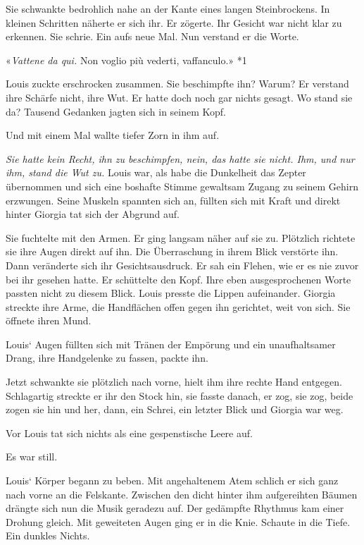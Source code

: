 Sie schwankte bedrohlich nahe an der Kante eines langen Steinbrockens.
In kleinen Schritten näherte er sich ihr. Er zögerte. Ihr Gesicht war
nicht klar zu erkennen. Sie schrie. Ein aufs neue Mal. Nun verstand er
die Worte.

«\emph{Vattene da qui.} Non voglio più vederti, vaffanculo.» *1

Louis zuckte erschrocken zusammen. Sie beschimpfte ihn? Warum? Er
verstand ihre Schärfe nicht, ihre Wut. Er hatte doch noch gar nichts
gesagt. Wo stand sie da? Tausend Gedanken jagten sich in seinem Kopf.

Und mit einem Mal wallte tiefer Zorn in ihm auf.

\emph{Sie hatte kein Recht, ihn zu beschimpfen, nein, das hatte sie
nicht. Ihm, und nur ihm, stand die Wut zu.} Louis war, als habe die
Dunkelheit das Zepter übernommen und sich eine boshafte Stimme gewaltsam
Zugang zu seinem Gehirn erzwungen. Seine Muskeln spannten sich an,
füllten sich mit Kraft und direkt hinter Giorgia tat sich der Abgrund
auf.

Sie fuchtelte mit den Armen. Er ging langsam näher auf sie zu. Plötzlich
richtete sie ihre Augen direkt auf ihn. Die Überraschung in ihrem Blick
verstörte ihn. Dann veränderte sich ihr Gesichtsausdruck. Er sah ein
Flehen, wie er es nie zuvor bei ihr gesehen hatte. Er schüttelte den
Kopf. Ihre eben ausgesprochenen Worte passten nicht zu diesem Blick.
Louis presste die Lippen aufeinander. Giorgia streckte ihre Arme, die
Handflächen offen gegen ihn gerichtet, weit von sich. Sie öffnete ihren
Mund.

Louis` Augen füllten sich mit Tränen der Empörung und ein unaufhaltsamer
Drang, ihre Handgelenke zu fassen, packte ihn.

Jetzt schwankte sie plötzlich nach vorne, hielt ihm ihre rechte Hand
entgegen. Schlagartig streckte er ihr den Stock hin, sie fasste danach,
er zog, sie zog, beide zogen sie hin und her, dann, ein Schrei, ein
letzter Blick und Giorgia war weg.

Vor Louis tat sich nichts als eine gespenstische Leere auf.

Es war still.

Louis` Körper begann zu beben. Mit angehaltenem Atem schlich er sich
ganz nach vorne an die Felskante. Zwischen den dicht hinter ihm
aufgereihten Bäumen drängte sich nun die Musik geradezu auf. Der
gedämpfte Rhythmus kam einer Drohung gleich. Mit geweiteten Augen ging
er in die Knie. Schaute in die Tiefe. Ein dunkles Nichts.

